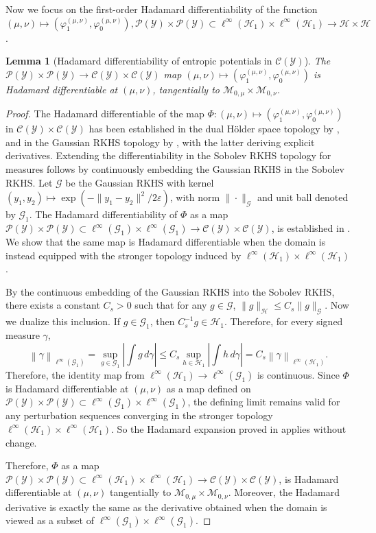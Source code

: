 \documentclass{article}
\theoremstyle{plain}
\newtheorem{lemma}[theorem]{Lemma}
\theoremstyle{definition}
\theoremstyle{remark}
\newcommand{\abs}[1]{\left|#1\right|}
\newcommand{\cH}{\mathcal{H}}
\newcommand{\cP}{\mathcal{P}}
\newcommand{\cG}{\mathcal{G}}
\newcommand{\cC}{\mathcal{C}}
\newcommand{\cM}{\mathcal{M}}
\newcommand{\cY}{\mathcal{Y}}
\newcommand{\1}{\mathbbm{1}}
\newcommand{\eps}{\varepsilon}
\newcommand{\norm}[1]{\left \| #1 \right \|}
\theoremstyle{plain}
\theoremstyle{definition}
\begin{document}
Now we focus on the first-order Hadamard differentiability of the function $(\mu, \nu) \mapsto (\varphi_1^{(\mu, \nu)}, \varphi_0^{(\mu, \nu)}), \cP(\cY) \times \cP(\cY) \subset \ell^\infty(\cH_1) \times \ell^\infty(\cH_1) \to \cH \times \cH$. 

\begin{lemma}[Hadamard differentiability of entropic potentials in $\cC(\cY)$] \label{lem:EOT_potential_derivative_C}
    The $\cP(\cY) \times \cP(\cY) \to \cC(\cY) \times \cC(\cY)$ map $(\mu, \nu) \mapsto (\varphi_1^{(\mu, \nu)}, \varphi_0^{(\mu, \nu)})$ is Hadamard differentiable at $(\mu, \nu)$, tangentially to $\cM_{0, \mu} \times \cM_{0, \nu}$. 
\end{lemma}
\begin{proof}
    The Hadamard differentiable of the map $\Phi: (\mu, \nu) \mapsto (\varphi_1^{(\mu, \nu)}, \varphi_0^{(\mu, \nu)})$ in $\cC(\cY) \times \cC(\cY)$ has been established in the dual Hölder space topology by \citet[Thm.~3]{goldfeld2024limit}, and in the Gaussian RKHS topology by \citet[Cor.~43]{kokot2025coreset}, with the latter deriving explicit derivatives. Extending the differentiability in the Sobolev RKHS topology for measures follows by continuously embedding the Gaussian RKHS in the Sobolev RKHS. 
    Let $\cG$ be the Gaussian RKHS with kernel $(y_1, y_2) \mapsto \exp(-\|y_1 - y_2\|^2/2\eps)$, with norm $\|\cdot\|_{\cG}$ and unit ball denoted by $\cG_1$. The Hadamard differentiability of $\Phi$ as a map $\cP(\cY)\times \cP(\cY)\subset \ell^\infty(\cG_1)\times \ell^\infty(\cG_1)
    \to \cC(\cY)\times \cC(\cY)$, is established in \citet[Cor.~43]{kokot2025coreset}. We show that the same map is Hadamard differentiable when the domain is instead equipped with the stronger topology induced by $\ell^\infty(\cH_1) \times \ell^\infty(\cH_1)$. 
    
    By the continuous embedding of the Gaussian RKHS into the Sobolev RKHS, there exists a constant $C_s>0$ such that for any $g \in \cG$, $\|g\|_{\cH} \leq C_s \|g\|_\cG$. Now we dualize this inclusion. If $g\in \cG_1$, then $C_s^{-1} g\in \cH_1$. Therefore, for every signed measure $\gamma$,
    \[
    \norm{\gamma}_{\ell^\infty(\cG_1)} = \sup_{g \in \cG_1} \abs{\int g \, d\gamma} \leq C_s \sup_{h \in \cH_1} \abs{\int h \, d\gamma} = C_s\norm{\gamma}_{\ell^\infty(\cH_1)}.
    \]
    Therefore, the identity map from $\ell^\infty(\cH_1) \to \ell^\infty(\cG_1)$ is continuous. 
Since $\Phi$ is Hadamard differentiable at $(\mu,\nu)$ as a map defined on $\cP(\cY)\times \cP(\cY)\subset \ell^\infty(\cG_1)\times \ell^\infty(\cG_1)$,
the defining limit remains valid for any perturbation sequences converging in the stronger topology $\ell^\infty(\cH_1)\times \ell^\infty(\cH_1)$. So the Hadamard expansion proved in \citet[Cor.~43]{kokot2025coreset} applies without change.

Therefore, $\Phi$ as a map $\cP(\cY)\times \cP(\cY)\subset \ell^\infty(\cH_1)\times \ell^\infty(\cH_1)
\to \cC(\cY)\times \cC(\cY)$, is Hadamard differentiable at $(\mu,\nu)$ tangentially to $\cM_{0,\mu}\times \cM_{0,\nu}$. Moreover, the Hadamard derivative is exactly the same as the derivative obtained when the domain is viewed as a subset of $\ell^\infty(\cG_1)\times \ell^\infty(\cG_1)$.
\end{proof}
\end{document}
